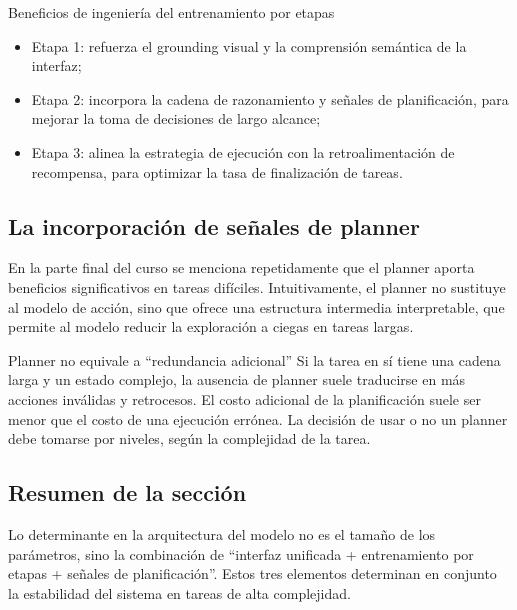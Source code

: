 \begin{knowledgebox}{Beneficios de ingeniería del entrenamiento por etapas}
\begin{itemize}
    \item Etapa 1: refuerza el grounding visual y la comprensión semántica de la interfaz;
    \item Etapa 2: incorpora la cadena de razonamiento y señales de planificación, para mejorar la toma de decisiones de largo alcance;
    \item Etapa 3: alinea la estrategia de ejecución con la retroalimentación de recompensa, para optimizar la tasa de finalización de tareas.
\end{itemize}
\end{knowledgebox}

\subsection{La incorporación de señales de planner}
En la parte final del curso se menciona repetidamente que el planner aporta beneficios significativos en tareas difíciles. Intuitivamente, el planner no sustituye al modelo de acción, sino que ofrece una estructura intermedia interpretable, que permite al modelo reducir la exploración a ciegas en tareas largas.

\begin{warningbox}{Planner no equivale a ``redundancia adicional''}
Si la tarea en sí tiene una cadena larga y un estado complejo, la ausencia de planner suele traducirse en más acciones inválidas y retrocesos. El costo adicional de la planificación suele ser menor que el costo de una ejecución errónea. La decisión de usar o no un planner debe tomarse por niveles, según la complejidad de la tarea.
\end{warningbox}

\subsection{Resumen de la sección}
Lo determinante en la arquitectura del modelo no es el tamaño de los parámetros, sino la combinación de ``interfaz unificada + entrenamiento por etapas + señales de planificación''. Estos tres elementos determinan en conjunto la estabilidad del sistema en tareas de alta complejidad.

